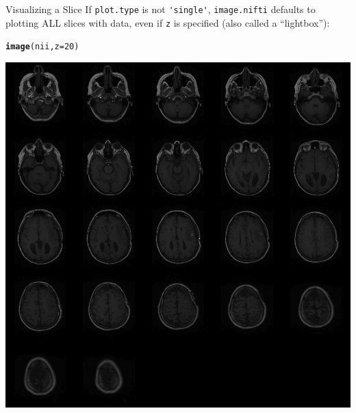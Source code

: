 \documentclass[11pt]{beamer}\usepackage[]{graphicx}\usepackage[]{color}
\makeatletter
\newcommand{\hlnum}[1]{\textcolor[rgb]{0.686,0.059,0.569}{#1}}%
\newcommand{\hlstd}[1]{\textcolor[rgb]{0.345,0.345,0.345}{#1}}%
\newcommand{\hlkwc}[1]{\textcolor[rgb]{0.333,0.667,0.333}{#1}}%
\newcommand{\hlkwd}[1]{\textcolor[rgb]{0.737,0.353,0.396}{\textbf{#1}}}%
\newenvironment{kframe}{%
 \def\at@end@of@kframe{}%
 \ifinner\ifhmode%
  \def\at@end@of@kframe{\end{minipage}}%
  \begin{minipage}{\columnwidth}%
 \fi\fi%
 \def\FrameCommand##1{\hskip\@totalleftmargin \hskip-\fboxsep
 \colorbox{shadecolor}{##1}\hskip-\fboxsep
     \hskip-\linewidth \hskip-\@totalleftmargin \hskip\columnwidth}%
 \MakeFramed {\advance\hsize-\width
   \@totalleftmargin\z@ \linewidth\hsize
   \@setminipage}}%
 {\par\unskip\endMakeFramed%
 \at@end@of@kframe}
\newenvironment{knitrout}{}{} %
\makeatother
\begin{document}
\begin{frame}[fragile]{Visualizing a Slice}
If \verb|plot.type| is not \verb|'single'|, \verb|image.nifti| defaults to plotting ALL slices with data, even if \verb|z| is specified (also called a ``lightbox''):

\begin{center}
\begin{knitrout}
\color{fgcolor}\begin{kframe}
\begin{alltt}
\hlkwd{image}\hlstd{(nii,} \hlkwc{z} \hlstd{=} \hlnum{20}\hlstd{)}
\end{alltt}
\end{kframe}
\includegraphics[width=\textwidth,height=0.5\textheight,keepaspectratio]{figure/image_mult-1} 

\end{knitrout}
\end{center}

\end{frame}
\end{document}

